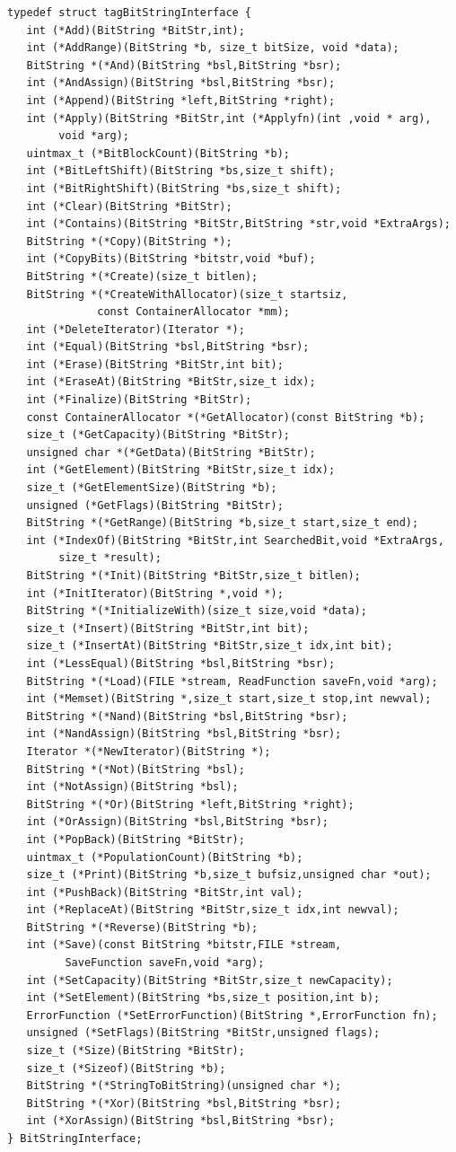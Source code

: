 \begin{verbatim}
typedef struct tagBitStringInterface {
   int (*Add)(BitString *BitStr,int);
   int (*AddRange)(BitString *b, size_t bitSize, void *data);
   BitString *(*And)(BitString *bsl,BitString *bsr);
   int (*AndAssign)(BitString *bsl,BitString *bsr);
   int (*Append)(BitString *left,BitString *right);
   int (*Apply)(BitString *BitStr,int (*Applyfn)(int ,void * arg),
        void *arg);
   uintmax_t (*BitBlockCount)(BitString *b);
   int (*BitLeftShift)(BitString *bs,size_t shift);
   int (*BitRightShift)(BitString *bs,size_t shift);
   int (*Clear)(BitString *BitStr);
   int (*Contains)(BitString *BitStr,BitString *str,void *ExtraArgs);
   BitString *(*Copy)(BitString *);
   int (*CopyBits)(BitString *bitstr,void *buf);
   BitString *(*Create)(size_t bitlen);
   BitString *(*CreateWithAllocator)(size_t startsiz,
              const ContainerAllocator *mm);
   int (*DeleteIterator)(Iterator *);
   int (*Equal)(BitString *bsl,BitString *bsr);
   int (*Erase)(BitString *BitStr,int bit);
   int (*EraseAt)(BitString *BitStr,size_t idx);
   int (*Finalize)(BitString *BitStr);
   const ContainerAllocator *(*GetAllocator)(const BitString *b);
   size_t (*GetCapacity)(BitString *BitStr);
   unsigned char *(*GetData)(BitString *BitStr);
   int (*GetElement)(BitString *BitStr,size_t idx);
   size_t (*GetElementSize)(BitString *b);
   unsigned (*GetFlags)(BitString *BitStr); 
   BitString *(*GetRange)(BitString *b,size_t start,size_t end);
   int (*IndexOf)(BitString *BitStr,int SearchedBit,void *ExtraArgs,
        size_t *result);
   BitString *(*Init)(BitString *BitStr,size_t bitlen);
   int (*InitIterator)(BitString *,void *);
   BitString *(*InitializeWith)(size_t size,void *data);
   size_t (*Insert)(BitString *BitStr,int bit);
   size_t (*InsertAt)(BitString *BitStr,size_t idx,int bit);
   int (*LessEqual)(BitString *bsl,BitString *bsr);
   BitString *(*Load)(FILE *stream, ReadFunction saveFn,void *arg);
   int (*Memset)(BitString *,size_t start,size_t stop,int newval);
   BitString *(*Nand)(BitString *bsl,BitString *bsr);
   int (*NandAssign)(BitString *bsl,BitString *bsr);
   Iterator *(*NewIterator)(BitString *);
   BitString *(*Not)(BitString *bsl);
   int (*NotAssign)(BitString *bsl);
   BitString *(*Or)(BitString *left,BitString *right);
   int (*OrAssign)(BitString *bsl,BitString *bsr);
   int (*PopBack)(BitString *BitStr);
   uintmax_t (*PopulationCount)(BitString *b);
   size_t (*Print)(BitString *b,size_t bufsiz,unsigned char *out);
   int (*PushBack)(BitString *BitStr,int val);
   int (*ReplaceAt)(BitString *BitStr,size_t idx,int newval);
   BitString *(*Reverse)(BitString *b);
   int (*Save)(const BitString *bitstr,FILE *stream,
         SaveFunction saveFn,void *arg);
   int (*SetCapacity)(BitString *BitStr,size_t newCapacity);
   int (*SetElement)(BitString *bs,size_t position,int b);
   ErrorFunction (*SetErrorFunction)(BitString *,ErrorFunction fn);
   unsigned (*SetFlags)(BitString *BitStr,unsigned flags);
   size_t (*Size)(BitString *BitStr); 
   size_t (*Sizeof)(BitString *b);
   BitString *(*StringToBitString)(unsigned char *);
   BitString *(*Xor)(BitString *bsl,BitString *bsr);
   int (*XorAssign)(BitString *bsl,BitString *bsr);
} BitStringInterface;
\end{verbatim}
